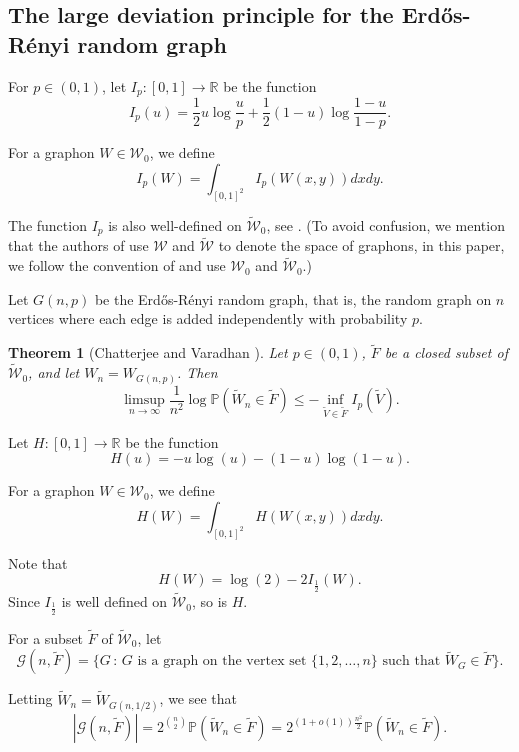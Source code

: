 \documentclass[11pt,a4paper]{article}
\theoremstyle{plain}
\newtheorem{theorem}{Theorem}[section]
\theoremstyle{definition}
\begin{document}
\subsection{The large deviation principle for the Erd\H{o}s-R\'enyi random graph}

For $p\in (0,1)$, let $I_{p}:[0,1]\to \mathbb{R}$ be the function
\[I_{p}(u)=\frac{1}2 u\log\frac{u}{p}+\frac{1}2 (1-u)\log\frac{1-u}{1-p}.\]

For a graphon $W\in\mathcal{W}_0$, we define
\[I_p(W)=\int_{[0,1]^2} I_p(W(x,y))dxdy.\]

The function $I_p$ is also well-defined on $\widetilde{\mathcal{W}}_0$, see \cite[Lemma 2.1]{chatterjee2011large}. (To avoid confusion, we mention that the authors of \cite{chatterjee2011large} use $\mathcal{W}$ and $\widetilde{\mathcal{W}}$ to denote the space of graphons, in this paper, we follow the convention of \cite{lovasz2012large} and use $\mathcal{W}_0$ and $\widetilde{\mathcal{W}}_0$.)

Let $G(n,p)$ be the Erd\H{o}s-R\'enyi random graph, that is, the random graph on $n$
vertices where each edge is added independently with probability $p$.

\begin{theorem}[Chatterjee and Varadhan \cite{chatterjee2011large}]\label{largediv0} Let $p\in (0,1)$, $\widetilde{F}$ be a closed subset of $\widetilde{\mathcal{W}}_0$, and let $W_n=W_{G(n,p)}$. Then
\[\limsup_{n\to\infty} \frac{1}{n^2}\log \mathbb{P}(\widetilde{W}_n\in \widetilde{F})\le -\inf_{\widetilde{V}\in \widetilde{F}} I_p(\widetilde{V}).\]
\end{theorem}

Let $H:[0,1]\to \mathbb{R}$ be the function
\[H(u)=-u\log(u)- (1-u)\log(1-u).\]

For a graphon $W\in\mathcal{W}_0$, we define
\[H(W)=\int_{[0,1]^2} H(W(x,y))dxdy.\]

Note that \begin{equation}\label{HvsI}H(W)=\log(2)-2I_{\frac{1}2}(W).\end{equation} Since $I_{\frac{1}2}$ is well defined on $\widetilde{\mathcal{W}}_0$, so is $H$.

For a subset $\widetilde{F}$ of $\widetilde{\mathcal{W}}_0$, let
\[\mathcal{G}(n,\widetilde{F})=\{G\,:\,G\text{ is a graph on the vertex set }\{1,2,\dots,n\}\text{ such that } \widetilde{W}_G\in \widetilde{F}\}.\]

Letting $\widetilde{W}_n=\widetilde{W}_{G(n,1/2)}$, we see that
\[|\mathcal{G}(n,\widetilde{F})|=2^{{n}\choose{2}}\mathbb{P}(\widetilde{W}_n\in \widetilde{F})=2^{(1+o(1))\frac{n^2}2}\mathbb{P}(\widetilde{W}_n\in \widetilde{F}).\]
\end{document}
